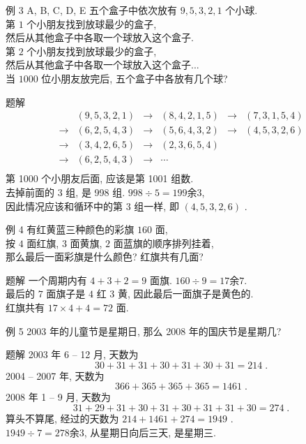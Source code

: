 \documentclass[content.tex]{subfiles}
\begin{document}
\begin{frame}{例 3}
A, B, C, D, E 五个盒子中依次放有 $9,5,3,2,1$ 个小球. \\
第 $1$ 个小朋友找到放球最少的盒子, \\
然后从其他盒子中各取一个球放入这个盒子. \\
第 $2$ 个小朋友找到放球最少的盒子, \\
然后从其他盒子中各取一个球放入这个盒子... \\
当 $1000$ 位小朋友放完后, 五个盒子中各放有几个球?
\begin{exampleblock}{题解}
$$
\begin{matrix}
    & (9,5,3,2,1) & \to & (8,4,2,1,5) & \to & (7,3,1,5,4) \\
\hline
\to & (6,2,5,4,3) & \to & (5,6,4,3,2) & \to & (4,5,3,2,6) \\
\to & (3,4,2,6,5) & \to & (2,3,6,5,4) \\
\hline
\to & (6,2,5,4,3) & \to & \cdots \\
\end{matrix}
$$
第 1000 个小朋友后面, 应该是第 1001 组数. \\
去掉前面的 3 组, 是 998 组. $998\div 5 = 199 \text{余} 3$, \\
因此情况应该和循环中的第 $3$ 组一样, 即 $(4,5,3,2,6)$ .
\end{exampleblock}
\end{frame}

\begin{frame}{例 4}
有红黄蓝三种颜色的彩旗 $160$ 面, \\
按 $4$ 面红旗, $3$ 面黄旗, $2$ 面蓝旗的顺序排列挂着, \\
那么最后一面彩旗是什么颜色? 红旗共有几面?
\begin{exampleblock}{题解}
一个周期内有 $4+3+2=9$ 面旗. $160\div 9=17\text{余}7$. \\
最后的 $7$ 面旗子是 $4$ 红 $3$ 黄, 因此最后一面旗子是黄色的. \\
红旗共有 $17\times 4 + 4 = 72$ 面.
\end{exampleblock}
\end{frame}

\begin{frame}{例 5}
2003 年的儿童节是星期日, 那么 2008 年的国庆节是星期几?
\begin{exampleblock}{题解}
2003 年 6 -- 12 月, 天数为 
$$30+31+31+30+31+30+31=214\;.$$
2004 -- 2007 年, 天数为
$$366+365+365+365=1461\;.$$
2008 年 1 -- 9 月, 天数为 
$$31+29+31+30+31+30+31+31+30=274\;.$$
算头不算尾, 经过的天数为 $214+1461+274=1949$ . \\
$1949\div 7=278\text{余}3$, 从星期日向后三天, 是星期三.
\end{exampleblock}
\end{frame}
\end{document}

